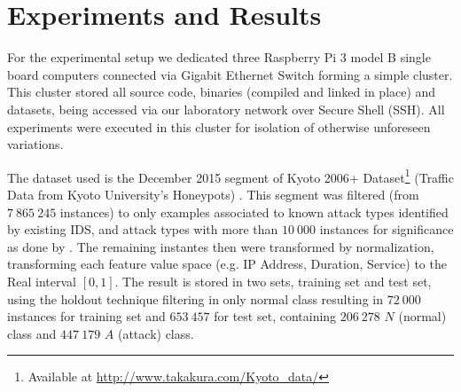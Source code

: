 
\section{Experiments and Results}
\label{sec:experiments}

For the experimental setup we dedicated three Raspberry Pi 3 model B single board computers
connected via Gigabit Ethernet Switch forming a simple cluster.
This cluster stored all source code, binaries (compiled and linked in place) and
datasets, being accessed via our laboratory network over Secure Shell (SSH).
All experiments were executed in this cluster for isolation of otherwise unforeseen
variations.

The dataset used is the December 2015 segment of
Kyoto 2006+ Dataset\footnote{Available at \url{http://www.takakura.com/Kyoto\_data/}}
(Traffic Data from Kyoto University's Honeypots)
\cite{Song2011}.
This segment was filtered (from $7\:865\:245$ instances) to only examples
associated to known attack types identified by existing IDS, and attack types
with more than $10\:000$ instances for significance as done by \cite{Cassales2019a}.
The remaining instantes then were transformed by normalization, transforming
each feature value space (e.g. IP Address, Duration, Service) to the
Real interval $[0, 1]$.
The result is stored in two sets, training set and test set, using the holdout
technique filtering in only normal class resulting in $72\:000$ instances for
training set and $653\:457$ for test set, containing $206\:278$ $N$ (normal) class
and $447\:179$ $A$ (attack) class.




